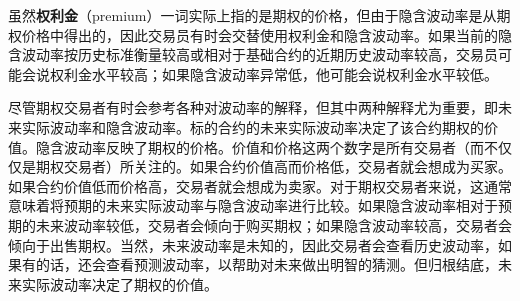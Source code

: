 虽然\textbf{权利金}（premium）一词实际上指的是期权的价格，但由于隐含波动率是从期权价格中得出的，因此交易员有时会交替使用权利金和隐含波动率。如果当前的隐含波动率按历史标准衡量较高或相对于基础合约的近期历史波动率较高，交易员可能会说权利金水平较高；如果隐含波动率异常低，他可能会说权利金水平较低。

尽管期权交易者有时会参考各种对波动率的解释，但其中两种解释尤为重要，即未来实际波动率和隐含波动率。标的合约的未来实际波动率决定了该合约期权的价值。隐含波动率反映了期权的价格。价值和价格这两个数字是所有交易者（而不仅仅是期权交易者）所关注的。如果合约价值高而价格低，交易者就会想成为买家。如果合约价值低而价格高，交易者就会想成为卖家。对于期权交易者来说，这通常意味着将预期的未来实际波动率与隐含波动率进行比较。如果隐含波动率相对于预期的未来波动率较低，交易者会倾向于购买期权；如果隐含波动率较高，交易者会倾向于出售期权。当然，未来波动率是未知的，因此交易者会查看历史波动率，如果有的话，还会查看预测波动率，以帮助对未来做出明智的猜测。但归根结底，未来实际波动率决定了期权的价值。